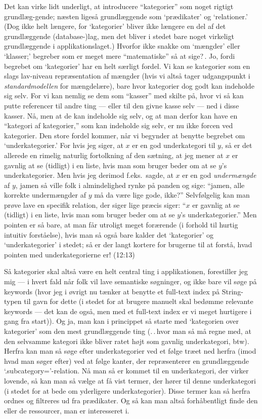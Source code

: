 \documentclass{report}
\begin{document}
Det kan virke lidt underligt, at introducere ``kategorier'' som noget rigtigt grundlæg-gende; næsten ligeså grundlæggende som `prædikater' og `relationer.' (Dog ikke helt længere, for `kategorier' bliver ikke længere en del af det grundlæggende (database-)lag, men det bliver i stedet bare noget virkeligt grundlæggende i applikationslaget.) Hvorfor ikke snakke om `mængder' eller `klasser;' begreber som er meget mere ``matematiske'' så at sige?\,. Jo, fordi begrebet om `kategorier' har en helt særligt fordel. Vi kan se kategorier som en slags lav-niveau repræsentation af mængder (hvis vi altså tager udgangspunkt i \emph{standardmodellen} for mængdelære), bare hvor kategorier dog godt kan indeholde sig selv. For vi kan nemlig se dem som ``kasser'' med skilte på, hvor vi så kan putte referencer til andre ting --- eller til den givne kasse selv --- ned i disse kasser. Nå, men at de kan indeholde sig selv, og at man derfor kan have en ``kategori af kategorier,'' som kan indeholde sig selv, er nu ikke forcen ved kategorier. Den store fordel kommer, når vi begynder at benytte begrebet om `underkategorier.' For hvis jeg siger, at $x$ er en god underkategori til $y$, så er det allerede en rimelig naturlig fortolkning af den sætning, at jeg mener at $x$ er gavnlig at se (tidligt) i en liste, hvis man som bruger beder om at se $y$'s underkategorier. Men hvis jeg derimod f.eks.\ sagde, at $x$ er en god \emph{undermængde} af $y$, jamen så ville folk i almindelighed rynke på panden og sige: ``jamen, alle korrekte undermængder af $y$ må da være lige gode, ikke?'' Selvfølgelig kan man prøve lave en specifik relation, der siger lige præcis siger: ``$x$ er gavnlig at se (tidligt) i en liste, hvis man som bruger beder om at se $y$'s underkategorier.'' Men pointen er så bare, at man får utroligt meget forærende (i forhold til hurtig intuitiv forståelse), hvis man så også bare kalder det `kategorier' og `underkategorier' i stedet; så er der langt kortere for brugerne til at forstå, hvad pointen med underkategorierne er! (12:13) %

Så kategorier skal altså være en helt central ting i applikationen, forestiller jeg mig --- i hvert fald når folk vil lave semantiske søgninger, og ikke bare vil søge på keywords (hvor jeg i øvrigt nu tænker at benytte et full-text index på String-typen til gavn for dette (i stedet for at brugere manuelt skal bedømme relevante keywords --- det kan de også, men med et full-text index er vi meget hurtigere i gang fra start)). Og ja, man kan i princippet så starte med `kategorien over kategorier' som den mest grundlæggende ting (.\,.\,hvor man så må regne med, at den selvsamme kategori ikke bliver ratet højt som gavnlig underkategori, btw). Herfra kan man så søge efter underkategorier ved et følge træet ned herfra (imod hvad man søger efter) ved at følge kanter, der repræsenterer en grundlæggende `.subcategory='-relation. Nå man så er kommet til en underkategori, der virker lovende, så kan man så vælge at få vist termer, der hører til denne underkategori (i stedet for at bede om yderligere underkategorier). Disse termer kan så herfra ordnes og filtreres ud fra prædikater. Og så kan man altså forhåbentligt finde den eller de ressourcer, man er interesseret i.
\end{document}
